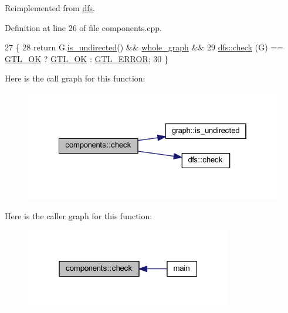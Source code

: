Reimplemented from \mbox{\hyperlink{classdfs_a1af70060897529e67910f589b047e576}{dfs}}.



Definition at line 26 of file components.\+cpp.


\begin{DoxyCode}
27 \{
28     \textcolor{keywordflow}{return} G.\mbox{\hyperlink{classgraph_aba427ff8ba0f70c68416ec1351344cd8}{is\_undirected}}() && \mbox{\hyperlink{classdfs_ab8342c80ab208ef0e0d781f0769d0d95}{whole\_graph}} && 
29     \mbox{\hyperlink{classdfs_a1af70060897529e67910f589b047e576}{dfs::check}} (G) == \mbox{\hyperlink{classalgorithm_af1a0078e153aa99c24f9bdf0d97f6710a5114c20e4a96a76b5de9f28bf15e282b}{GTL\_OK}} ? \mbox{\hyperlink{classalgorithm_af1a0078e153aa99c24f9bdf0d97f6710a5114c20e4a96a76b5de9f28bf15e282b}{GTL\_OK}} : \mbox{\hyperlink{classalgorithm_af1a0078e153aa99c24f9bdf0d97f6710a6fcf574690bbd6cf710837a169510dd7}{GTL\_ERROR}};
30 \}
\end{DoxyCode}
Here is the call graph for this function\+:\nopagebreak
\begin{figure}[H]
\begin{center}
\leavevmode
\includegraphics[width=322pt]{classcomponents_aeeda901d02c65d6c31c8b6148540d7c1_cgraph}
\end{center}
\end{figure}
Here is the caller graph for this function\+:\nopagebreak
\begin{figure}[H]
\begin{center}
\leavevmode
\includegraphics[width=256pt]{classcomponents_aeeda901d02c65d6c31c8b6148540d7c1_icgraph}
\end{center}
\end{figure}
\mbox{\label{classdfs_aceb066c806cb0beb5688b167a17387c7}} 
